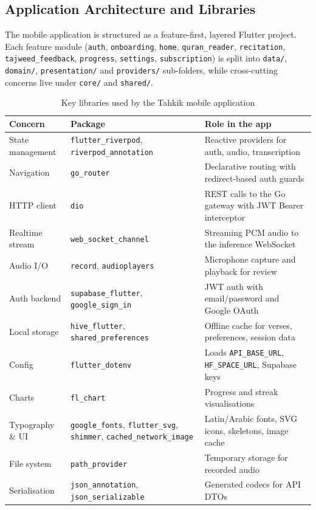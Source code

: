 \subsection{Application Architecture and Libraries}
\label{sec:impl_app_arch}

The mobile application is structured as a feature-first, layered Flutter project. Each feature module (\texttt{auth}, \texttt{onboarding}, \texttt{home}, \texttt{quran\_reader}, \texttt{recitation}, \texttt{tajweed\_feedback}, \texttt{progress}, \texttt{settings}, \texttt{subscription}) is split into \texttt{data/}, \texttt{domain/}, \texttt{presentation/} and \texttt{providers/} sub-folders, while cross-cutting concerns live under \texttt{core/} and \texttt{shared/}.

\begin{table}[H]
  \centering
  \caption{Key libraries used by the Tahkik mobile application}
  \label{tab:impl_app_libs}
  \renewcommand{\arraystretch}{1.3}
  \begin{tabular}{lp{4.2cm}p{6cm}}
    \toprule
    \textbf{Concern} & \textbf{Package} & \textbf{Role in the app} \\
    \midrule
    State management & \texttt{flutter\_riverpod}, \texttt{riverpod\_annotation} & Reactive providers for auth, audio, transcription \\
    Navigation       & \texttt{go\_router}                & Declarative routing with redirect-based auth guards \\
    HTTP client      & \texttt{dio}                       & REST calls to the Go gateway with JWT Bearer interceptor \\
    Realtime stream  & \texttt{web\_socket\_channel}      & Streaming PCM audio to the inference WebSocket \\
    Audio I/O        & \texttt{record}, \texttt{audioplayers} & Microphone capture and playback for review \\
    Auth backend     & \texttt{supabase\_flutter}, \texttt{google\_sign\_in} & JWT auth with email/password and Google OAuth \\
    Local storage    & \texttt{hive\_flutter}, \texttt{shared\_preferences} & Offline cache for verses, preferences, session data \\
    Config           & \texttt{flutter\_dotenv}           & Loads \texttt{API\_BASE\_URL}, \texttt{HF\_SPACE\_URL}, Supabase keys \\
    Charts           & \texttt{fl\_chart}                 & Progress and streak visualisations \\
    Typography \& UI & \texttt{google\_fonts}, \texttt{flutter\_svg}, \texttt{shimmer}, \texttt{cached\_network\_image} & Latin/Arabic fonts, SVG icons, skeletons, image cache \\
    File system      & \texttt{path\_provider}            & Temporary storage for recorded audio \\
    Serialisation    & \texttt{json\_annotation}, \texttt{json\_serializable} & Generated codecs for API DTOs \\
    \bottomrule
  \end{tabular}
\end{table}

